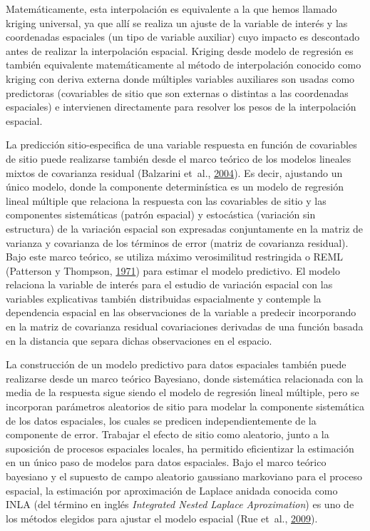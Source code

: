 \documentclass[11pt,b5paper,]{krantz}
\begin{document}
Matemáticamente, esta interpolación es equivalente a la que hemos llamado kriging universal, ya que allí se realiza un ajuste de la variable de interés y las coordenadas espaciales (un tipo de variable auxiliar) cuyo impacto es descontado antes de realizar la interpolación espacial. Kriging desde modelo de regresión es también equivalente matemáticamente al método de interpolación conocido como kriging con deriva externa donde múltiples variables auxiliares son usadas como predictoras (covariables de sitio que son externas o distintas a las coordenadas espaciales) e intervienen directamente para resolver los pesos de la interpolación espacial.

La predicción sitio-especifica de una variable respuesta en función de covariables de sitio puede realizarse también desde el marco teórico de los modelos lineales mixtos de covarianza residual (Balzarini et~al., \protect\hyperlink{ref-Balzarini_Macchiavelli_Casanoves_2004}{2004}). Es decir, ajustando un único modelo, donde la componente determinística es un modelo de regresión lineal múltiple que relaciona la respuesta con las covariables de sitio y las componentes sistemáticas (patrón espacial) y estocástica (variación sin estructura) de la variación espacial son expresadas conjuntamente en la matriz de varianza y covarianza de los términos de error (matriz de covarianza residual). Bajo este marco teórico, se utiliza máximo verosimilitud restringida o REML (Patterson y Thompson, \protect\hyperlink{ref-Patterson_Thompson_1971}{1971}) para estimar el modelo predictivo. El modelo relaciona la variable de interés para el estudio de variación espacial con las variables explicativas también distribuidas espacialmente y contemple la dependencia espacial en las observaciones de la variable a predecir incorporando en la matriz de covarianza residual covariaciones derivadas de una función basada en la distancia que separa dichas observaciones en el espacio.

La construcción de un modelo predictivo para datos espaciales también puede realizarse desde un marco teórico Bayesiano, donde sistemática relacionada con la media de la respuesta sigue siendo el modelo de regresión lineal múltiple, pero se incorporan parámetros aleatorios de sitio para modelar la componente sistemática de los datos espaciales, los cuales se predicen independientemente de la componente de error. Trabajar el efecto de sitio como aleatorio, junto a la suposición de procesos espaciales locales, ha permitido eficientizar la estimación en un único paso de modelos para datos espaciales. Bajo el marco teórico bayesiano y el supuesto de campo aleatorio gaussiano markoviano para el proceso espacial, la estimación por aproximación de Laplace anidada conocida como INLA (del término en inglés \emph{Integrated Nested Laplace Aproximation}) es uno de los métodos elegidos para ajustar el modelo espacial (Rue et~al., \protect\hyperlink{ref-Rue_Martino_Chopin_2009}{2009}).
\end{document}
